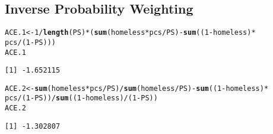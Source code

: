 \documentclass[oneside]{book}\usepackage[]{graphicx}\usepackage[svgnames]{xcolor}
\makeatletter
\newcommand{\hlnum}[1]{\textcolor[rgb]{0.686,0.059,0.569}{#1}}%
\newcommand{\hlopt}[1]{\textcolor[rgb]{0,0,0}{#1}}%
\newcommand{\hlstd}[1]{\textcolor[rgb]{0.345,0.345,0.345}{#1}}%
\newcommand{\hlkwb}[1]{\textcolor[rgb]{0.69,0.353,0.396}{#1}}%
\newcommand{\hlkwd}[1]{\textcolor[rgb]{0.737,0.353,0.396}{\textbf{#1}}}%
\newenvironment{kframe}{%
 \def\at@end@of@kframe{}%
 \ifinner\ifhmode%
  \def\at@end@of@kframe{\end{minipage}}%
  \begin{minipage}{\columnwidth}%
 \fi\fi%
 \def\FrameCommand##1{\hskip\@totalleftmargin \hskip-\fboxsep
 \colorbox{shadecolor}{##1}\hskip-\fboxsep
     \hskip-\linewidth \hskip-\@totalleftmargin \hskip\columnwidth}%
 \MakeFramed {\advance\hsize-\width
   \@totalleftmargin\z@ \linewidth\hsize
   \@setminipage}}%
 {\par\unskip\endMakeFramed%
 \at@end@of@kframe}
\newenvironment{knitrout}{}{} %
\makeatother
\begin{document}
\subsection{Inverse Probability Weighting}
\begin{knitrout}
\color{fgcolor}\begin{kframe}
\begin{alltt}
\hlstd{ACE.1} \hlkwb{<-} \hlnum{1}\hlopt{/}\hlkwd{length}\hlstd{(PS)} \hlopt{*} \hlstd{(}\hlkwd{sum}\hlstd{(homeless} \hlopt{*} \hlstd{pcs}\hlopt{/}\hlstd{PS)} \hlopt{-} \hlkwd{sum}\hlstd{((}\hlnum{1} \hlopt{-} \hlstd{homeless)} \hlopt{*}
  \hlstd{pcs}\hlopt{/}\hlstd{(}\hlnum{1} \hlopt{-} \hlstd{PS)))}
\hlstd{ACE.1}
\end{alltt}
\begin{verbatim}
[1] -1.652115
\end{verbatim}
\begin{alltt}
\hlstd{ACE.2} \hlkwb{<-} \hlkwd{sum}\hlstd{(homeless} \hlopt{*} \hlstd{pcs}\hlopt{/}\hlstd{PS)}\hlopt{/}\hlkwd{sum}\hlstd{(homeless}\hlopt{/}\hlstd{PS)} \hlopt{-} \hlkwd{sum}\hlstd{((}\hlnum{1} \hlopt{-} \hlstd{homeless)} \hlopt{*}
  \hlstd{pcs}\hlopt{/}\hlstd{(}\hlnum{1} \hlopt{-} \hlstd{PS))}\hlopt{/}\hlkwd{sum}\hlstd{((}\hlnum{1} \hlopt{-} \hlstd{homeless)}\hlopt{/}\hlstd{(}\hlnum{1} \hlopt{-} \hlstd{PS))}
\hlstd{ACE.2}
\end{alltt}
\begin{verbatim}
[1] -1.302807
\end{verbatim}
\end{kframe}
\end{knitrout}
\end{document}
